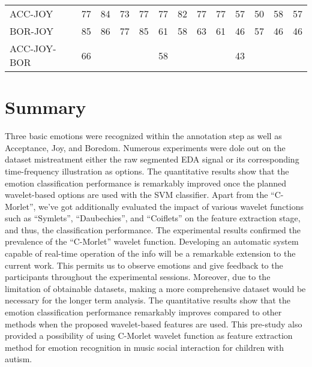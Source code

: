 \begin{sidewaystable}[]
{\begin{tabular}{llllllllllllll}
		ACC-JOY     &                        & 77       & 84  & 73        & 77     & 77             & 82       & 77             & 77          & 57       & 50  & 58        & 57     \\
		BOR-JOY     &                        & 85       & 86  & 77        & 85     & 61             & 58       & 63             & 61          & 46       & 57  & 46        & 46     \\
		ACC-JOY-BOR &                        & 66       &     &           &        & 58             &          &                &             & 43       &     &           &        \\ \hline
	\end{tabular}
}

\label{svmknn}
\end{sidewaystable}

\section{Summary}
Three basic emotions were recognized within the annotation step as well as Acceptance, Joy, 
and Boredom. Numerous experiments were dole out on the dataset mistreatment either the raw 
segmented EDA signal or its corresponding time-frequency illustration as options. 
The quantitative results show that the emotion classification performance is remarkably 
improved once the planned wavelet-based options are used with the SVM classifier. 
Apart from the “C-Morlet”, we've got additionally evaluated the impact of various wavelet functions such 
as “Symlets”, “Daubechies”, and “Coiflets” on the feature extraction stage, and thus, 
the classification performance. The experimental results confirmed the prevalence of 
the “C-Morlet” wavelet function. Developing an automatic system capable of real-time operation 
of the info will be a remarkable extension to the current work. This permits us to observe emotions 
and give feedback to the participants throughout the experimental sessions. Moreover, due to the 
limitation of obtainable datasets, making a more comprehensive dataset would be necessary 
for the longer term analysis. The quantitative results show that the emotion classification 
performance remarkably improves compared to other methods when the proposed wavelet-based features 
are used. This pre-study also provided a possibility of using C-Morlet wavelet function as feature 
extraction method for emotion recognition in music social interaction for children with autism.\\
 